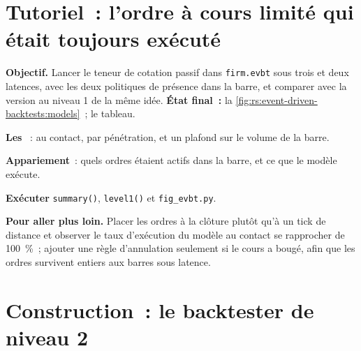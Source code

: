 \section{Tutoriel~: l'ordre à cours limité qui était toujours exécuté}\label{tut:rs:event-driven-backtests:tut}

\begin{tutorial}
\textbf{Objectif.} Lancer le teneur de cotation passif dans \texttt{firm.evbt} sous trois  et deux latences, avec les deux politiques de présence dans la barre, et comparer avec
la version au niveau 1 de la même idée. \textbf{État final~:} la \cref{fig:rs:event-driven-backtests:models}~; le tableau.
\begin{tutsteps}
\item \textbf{Les }~: au contact, par pénétration, et un plafond sur le volume de la barre.
\label{lst:rs:event-driven-backtests:fills}
\item \textbf{Appariement}~: quels ordres étaient actifs dans la barre, et ce que le modèle exécute.
\label{lst:rs:event-driven-backtests:match}
\item \textbf{Exécuter} \texttt{summary()}, \texttt{level1()} et \texttt{fig\_evbt.py}.
\end{tutsteps}
\textbf{Pour aller plus loin.} Placer les ordres à la clôture plutôt qu'à un tick de distance et observer le taux d'exécution du modèle au contact se rapprocher de 100~\%~; ajouter une
règle d'annulation seulement si le cours a bougé, afin que les ordres survivent entiers aux barres sous latence.
\end{tutorial}

\section{Construction~: le backtester de niveau 2}\label{bld:rs:event-driven-backtests:evbt}

